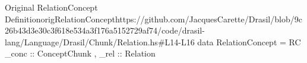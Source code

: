 \begin{haskell}{Original RelationConcept Definition}{origRelationConcept}{https://github.com/JacquesCarette/Drasil/blob/9c26b43d3e30c3f618e534a3f176a5152729af74/code/drasil-lang/Language/Drasil/Chunk/Relation.hs\#L14-L16}
data RelationConcept = RC { _conc :: ConceptChunk
                           , _rel :: Relation
                           }
\end{haskell}
